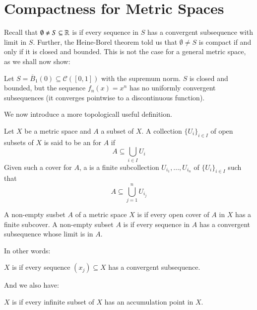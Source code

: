 \section{Compactness for Metric Spaces}

Recall that $\emptyset \neq S \subseteq \mathbb R$ is  if every sequence in $S$ has a convergent subsequence with limit in $S$. Further, the Heine-Borel theorem told us that $\emptyset \neq S$ is compact if and only if it is closed and bounded. This is not the case for a general metric space, as we shall now show:

\begin{eg}
    Let $S = \overline{B}_1(0) \subseteq \mathcal{C}([0,1])$ with the supremum norm. $S$ is closed and bounded, but the sequence $f_n(x) = x^n$ has no uniformly convergent subsequences (it converges pointwise to a discontinuous function).
\end{eg}

We now introduce a more topologicall useful definition.

\begin{defn}
    Let $X$ be a metric space and $A$ a subset of $X$. A collection $\{U_i\}_{i \in I}$ of open subsets of $X$ is said to be an  for $A$ if $$A \subseteq \bigcup_{i\in I}U_i$$ Given such a cover for $A$, a  is a finite subcollection $U_{i_1},...,U_{i_n}$ of $\{U_i\}_{i \in I}$ such that $$A \subseteq \bigcup_{j=1}^nU_{i_j}$$
\end{defn}

\begin{defn}[Compactness]
    A non-empty susbet $A$ of a metric space $X$ is  if every open cover of $A$ in $X$ has a finite subcover. A non-empty subset $A$ is  if every sequence in $A$ has a convergent subsequence whose limit is in $A$.
\end{defn}

In other words:

\begin{defn}
    $X$ is  if every sequence $(x_j) \subseteq X$ has a convergent subsequence.
\end{defn}

And we also have:

\begin{defn}
    $X$ is  if every infinite subset of $X$ has an accumulation point in $X$.
\end{defn}

